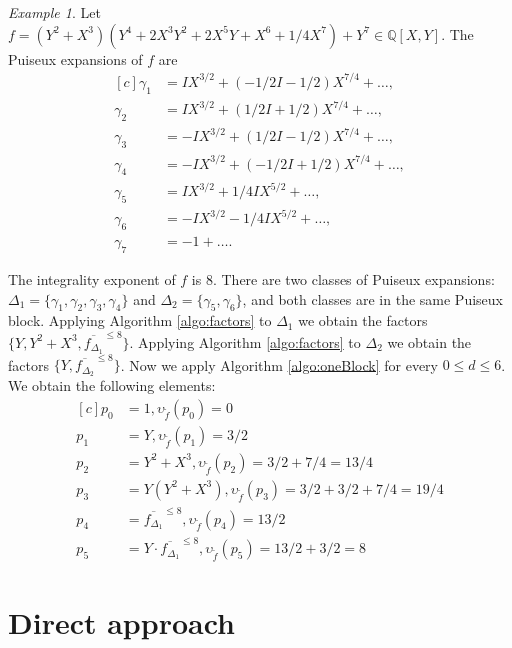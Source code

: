 \documentclass[a4paper,11pt]{amsart}%
\theoremstyle{definition}
\theoremstyle{plain}
\theoremstyle{remark}
\newtheorem{example}[defn]{Example}
\begin{document}
\begin{example}
\label{example:oneBlock}
Let $f = (Y^2+X^3)(Y^4 + 2X^3Y^2 + 2X^5Y + X^6 + 1/4X^7) + Y^7 \in{\mathbb{Q}}[X,Y]$.
The Puiseux expansions of $f$ are
\begin{equation*}
\begin{aligned}[c]
\gamma_{1} &=IX^{3/2} +(-1/2I-1/2)X^{7/4} + \dots,\\
\gamma_{2} &=IX^{3/2} +(1/2I+1/2)X^{7/4} + \dots,\\
\gamma_{3} &=-IX^{3/2}+(1/2I-1/2)X^{7/4} + \dots,\\
\gamma_{4} &=-IX^{3/2}+(-1/2I+1/2)X^{7/4} + \dots,\\
\gamma_{5} &=IX^{3/2}+ 1/4 I X^{5/2} + \dots,\\
\gamma_{6} &=-IX^{3/2} - 1/4 I X^{5/2} +  \dots,\\
\gamma_{7} &=-1 + \dots.
\end{aligned}
\end{equation*}

The integrality exponent of $f$ is 8. There are two classes of Puiseux expansions: $\Delta_1 = \{\gamma_1, \gamma_2, \gamma_3, \gamma_4\}$ and $\Delta_2 = \{\gamma_5, \gamma_6\}$, and both classes are in the same Puiseux block. Applying Algorithm \ref{algo:factors} to $\Delta_1$ we obtain the factors $\{Y, Y^2 + X^3, \overline{f_{\Delta_1}}^{\le 8}\}$. Applying Algorithm \ref{algo:factors} to $\Delta_2$ we obtain the factors $\{Y, \overline{f_{\Delta_2}}^{\le 8}\}$. Now we apply Algorithm \ref{algo:oneBlock} for every $0 \le d \le 6$. We obtain the following elements:
$$
\begin{aligned}[c]
p_0 &= 1, \upsilon_{\tilde f}(p_0) = 0 \\
p_1 &= Y, \upsilon_{\tilde f}(p_1) = 3/2 \\
p_2 &= Y^2+X^3, \upsilon_{\tilde f}(p_2) = 3/2+7/4 = 13/4\\
p_3 &= Y(Y^2+X^3), \upsilon_{\tilde f}(p_3) = 3/2+3/2+7/4 = 19/4 \\
p_4 &= \overline{f_{\Delta_1}}^{\le 8}, \upsilon_{\tilde f}(p_4) = 13/2 \\
p_5 &= Y\cdot\overline{f_{\Delta_1}}^{\le 8}, \upsilon_{\tilde f}(p_5) = 13/2+3/2=8
\end{aligned}
$$
\end{example}

\section{Direct approach}
\label{section:directApproach}
\end{document}
